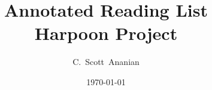 \documentclass[10pt,notitlepage]{article}
\author{C.~Scott~Ananian}
\title{Annotated Reading List \\ \Large Harpoon Project}
\date{\today}
\begin{document}

\maketitle
\nocite{*}
\end{document}
